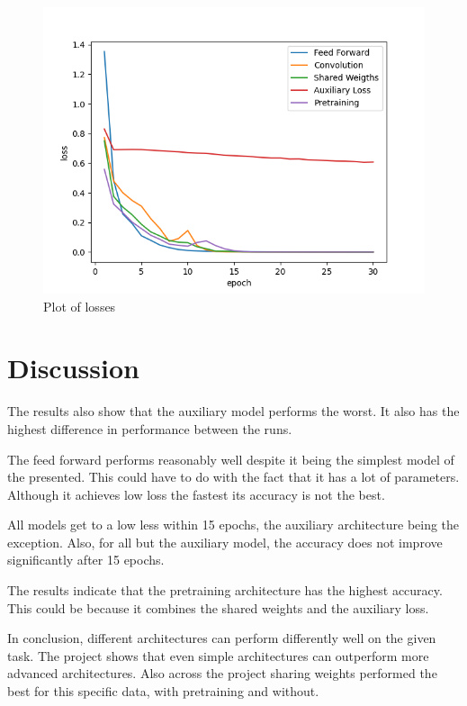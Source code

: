 \documentclass[12pt]{article}
\begin{document}
\begin{figure}[h]
\centering
\includegraphics[width=\textwidth]{"losss.png"}
\caption{Plot of losses}
\end{figure}
\section{Discussion}
The results also show that the auxiliary model performs the worst.
It also has the highest difference in performance between the runs.

The feed forward performs reasonably well despite it being the simplest model of the presented.
This could have to do with the fact that it has a lot of parameters.
Although it achieves low loss the fastest its accuracy is not the best.

All models get to a low less within 15 epochs, the auxiliary architecture being the exception.
Also, for all but the auxiliary model, the accuracy does not improve significantly after 15 epochs.

The results indicate that the pretraining architecture has the highest accuracy.
This could be because it combines the shared weights and the auxiliary loss.

In conclusion, different architectures can perform differently well on the given task.
The project shows that even simple architectures can outperform more advanced architectures.
Also across the project sharing weights performed the best for this specific data, with pretraining and without.
\end{document}
